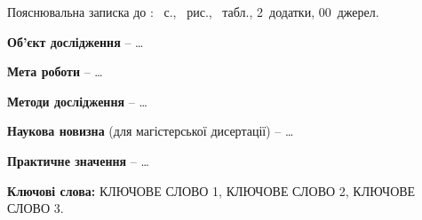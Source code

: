 %

Пояснювальна записка до \workType: \pageref{LastPage}~с.,
~рис., ~табл., 2~додатки, 00~джерел.

\textbf{Об'єкт дослідження} -- \dots

\textbf{Мета роботи} -- \dots

\textbf{Методи дослідження} -- \dots

\textbf{Наукова новизна} (для магістерської дисертації) -- \dots

\textbf{Практичне значення} -- \dots

\textbf{Ключові слова:} \MakeUppercase{ключове слово 1, ключове слово 2,
ключове слово 3}.

